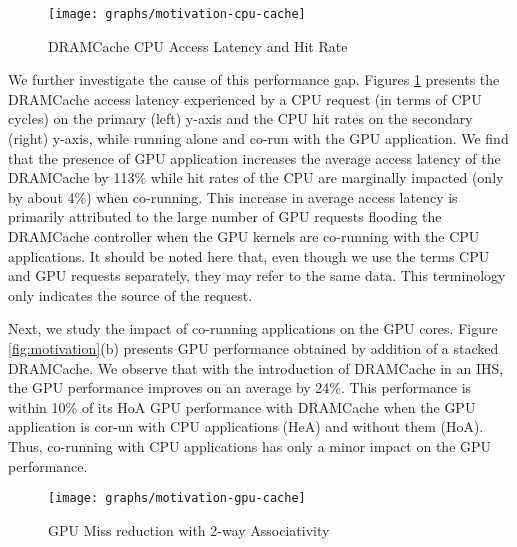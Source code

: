 \begin{figure}[htb]
	\centering
	\texttt{[image: graphs/motivation-cpu-cache]}
	\caption{DRAMCache CPU Access Latency and Hit Rate}
	\label{fig:motivation-cpu-cache}
\end{figure}

\par We further investigate the cause of this performance gap. Figures \ref{fig:motivation-cpu-cache} presents the DRAMCache access latency experienced by a CPU request (in terms of CPU cycles) on the primary (left) y-axis and the CPU hit rates on the secondary (right) y-axis, while running alone and co-run with the GPU application. We find that the presence of GPU application increases the average access latency of the DRAMCache by 113\% while hit rates of the CPU are marginally impacted (only by about 4\%) when co-running.
This increase in average access latency is primarily attributed to the large
number of GPU requests flooding the DRAMCache controller when the GPU kernels are co-running with the CPU applications.
It should be noted here that, even though we use the terms CPU and GPU requests separately, they may refer to the same data. This terminology only indicates the source of the request. 
\par Next, we study the impact of co-running applications on the GPU cores. Figure \ref{fig:motivation}(b) presents GPU performance obtained by addition of a stacked DRAMCache.
We observe that with the introduction of DRAMCache in an IHS, the GPU performance improves on an average by 24\%. This performance is within 10\% of its HoA GPU performance with DRAMCache when the GPU application is cor-un with CPU applications (HeA) and without them (HoA).
Thus, co-running with CPU applications has only a minor impact on the GPU performance. 
\begin{figure}[htb]
   \centering
   \texttt{[image: graphs/motivation-gpu-cache]}
   \caption{GPU Miss reduction with 2-way Associativity}
   \label{fig:motivation-gpu-cache}
\end{figure}

